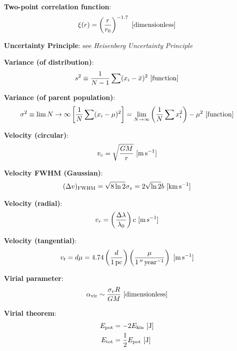 \documentclass[a4paper,10pt]{article}
\begin{document}
{\noindent}\textbf{Two-point correlation function}:
\begin{align*}
    \xi(r) = \left(\frac{r}{r_0}\right)^{-1.7} ~ [{\rm dimensionless}] 
\end{align*}

{\noindent}\textbf{Uncertainty Principle}: see \textit{Heisenberg Uncertainty Principle}

{\noindent}\textbf{Variance (of distribution)}:
\begin{align*}
    s^2 \equiv \frac{1}{N-1} \sum (x_i-\bar{x})^2 ~ [{\rm function}]
\end{align*}

{\noindent}\textbf{Variance (of parent population)}:
\begin{align*}
    \sigma^2 \equiv \lim{N\rightarrow\infty} \left[\frac{1}{N}\sum(x_i-\mu)^2\right] = \lim_{N\rightarrow\infty} \left(\frac{1}{N}\sum x_i^2\right)-\mu^2 ~ [{\rm function}]
\end{align*}

{\noindent}\textbf{Velocity (circular)}:
\begin{align*}
    v_c = \sqrt{\frac{GM}{r}} ~ [{\rm m\,s^{-1}}]
\end{align*}

{\noindent}\textbf{Velocity FWHM (Gaussian)}:
\begin{align*}
    (\Delta v)_{\rm FWHM} = \sqrt{8\ln2}\sigma_v = 2\sqrt{\ln2}b ~ [{\rm km\,s^{-1}}]
\end{align*}

{\noindent}\textbf{Velocity (radial)}:
\begin{align*}
    v_r = \left(\frac{\Delta\lambda}{\lambda_0}\right)c ~ [{\rm m\,s^{-1}}]
\end{align*}

{\noindent}\textbf{Velocity (tangential)}:
\begin{align*}
    v_t = d\mu = 4.74\left(\frac{d}{1\,{\rm pc}}\right) \left(\frac{\mu}{1\,''\,{\rm year^{-1}}}\right) ~ [{\rm m\,s^{-1}}]
\end{align*}

{\noindent}\textbf{Virial parameter}:
\begin{align*}
    \alpha_\mathrm{vir} \sim \frac{\sigma_vR}{GM} ~ [{\rm dimensionless}]
\end{align*}

{\noindent}\textbf{Virial theorem}:
\begin{align*}
    E_\mathrm{pot} &= -2E_\mathrm{kin} ~ [{\rm J}] \\
    E_\mathrm{tot} &= \frac{1}{2}E_\mathrm{pot} ~ [{\rm J}]
\end{align*}
\end{document}
